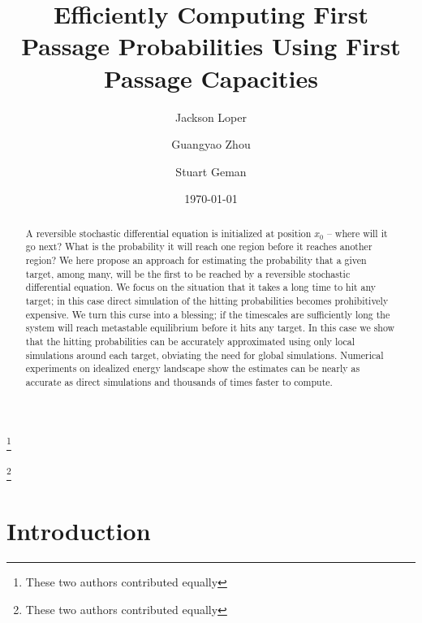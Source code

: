 \documentclass[12pt, nofootinbib,english, amsmath, amssymb, aps, priprint, graphicx,floatfix]{revtex4-1}
\theoremstyle{plain}
\theoremstyle{definition}
\theoremstyle{plain}
\begin{document}
\title{Efficiently Computing First Passage Probabilities Using First Passage Capacities} %

\author{Jackson Loper}
\thanks{These two authors contributed equally}

\author{Guangyao Zhou}
\thanks{These two authors contributed equally}

\author{Stuart Geman}

\date{\today}

\begin{abstract}
	A reversible stochastic differential equation is initialized at position $x_0$ -- where will it go next?  What is the probability it will reach one region before it reaches another region?  We here propose an approach for estimating the probability that a given target, among many, will be the first to be reached by a reversible stochastic differential equation.   We focus on the situation that it takes a long time to hit any target; in this case direct simulation of the hitting probabilities becomes prohibitively expensive.  We turn this curse into a blessing; if the timescales are sufficiently long the system will reach metastable equilibrium before it hits any target.  In this case we show that the hitting probabilities can be accurately approximated using only local simulations around each target, obviating the need for global simulations.  Numerical experiments on idealized energy landscape show the estimates can be nearly as accurate as direct simulations and thousands of times faster to compute.
\end{abstract}

\pacs{}%

\maketitle %

\section{Introduction}
\label{sec:Introduction}
\end{document}
